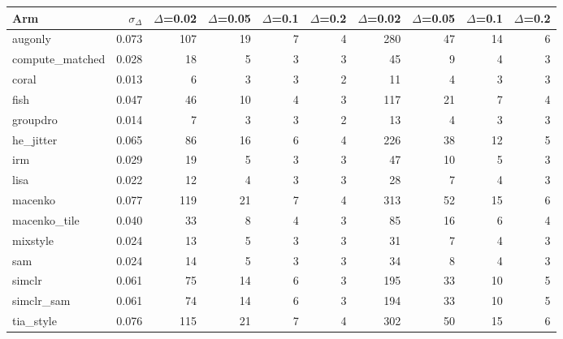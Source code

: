 \begin{tabular}{lrrrrrrrrr}
\toprule
Arm & $\sigma_\Delta$ & $\Delta$=0.02 & $\Delta$=0.05 & $\Delta$=0.1 & $\Delta$=0.2 & $\Delta$=0.02 & $\Delta$=0.05 & $\Delta$=0.1 & $\Delta$=0.2 \\
\midrule
augonly & 0.073 & 107 & 19 & 7 & 4 & 280 & 47 & 14 & 6 \\
compute\_matched & 0.028 & 18 & 5 & 3 & 3 & 45 & 9 & 4 & 3 \\
coral & 0.013 & 6 & 3 & 3 & 2 & 11 & 4 & 3 & 3 \\
fish & 0.047 & 46 & 10 & 4 & 3 & 117 & 21 & 7 & 4 \\
groupdro & 0.014 & 7 & 3 & 3 & 2 & 13 & 4 & 3 & 3 \\
he\_jitter & 0.065 & 86 & 16 & 6 & 4 & 226 & 38 & 12 & 5 \\
irm & 0.029 & 19 & 5 & 3 & 3 & 47 & 10 & 5 & 3 \\
lisa & 0.022 & 12 & 4 & 3 & 3 & 28 & 7 & 4 & 3 \\
macenko & 0.077 & 119 & 21 & 7 & 4 & 313 & 52 & 15 & 6 \\
macenko\_tile & 0.040 & 33 & 8 & 4 & 3 & 85 & 16 & 6 & 4 \\
mixstyle & 0.024 & 13 & 5 & 3 & 3 & 31 & 7 & 4 & 3 \\
sam & 0.024 & 14 & 5 & 3 & 3 & 34 & 8 & 4 & 3 \\
simclr & 0.061 & 75 & 14 & 6 & 3 & 195 & 33 & 10 & 5 \\
simclr\_sam & 0.061 & 74 & 14 & 6 & 3 & 194 & 33 & 10 & 5 \\
tia\_style & 0.076 & 115 & 21 & 7 & 4 & 302 & 50 & 15 & 6 \\
\bottomrule
\end{tabular}
